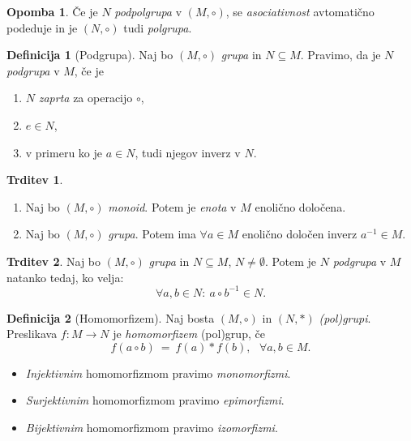\documentclass[11pt]{article}
\newcommand{\0}{\mathbf{0}}
\newcommand{\M}{M}
\newcommand{\NN}{N}
\theoremstyle{definition}
\newtheorem{definicija}{Definicija}[section]
\theoremstyle{definition}
\newtheorem{trditev}{Trditev}[section]
\theoremstyle{definition}
\theoremstyle{definition}
\newtheorem*{opomba}{Opomba}
\begin{document}
\begin{opomba}

Če je $\NN$ \textit{podpolgrupa} v $(\M, \circ)$, se \textit{asociativnost} avtomatično podeduje in je $(\NN, \circ)$ tudi \textit{polgrupa}.

\end{opomba}
\vspace{0.5cm}

\begin{definicija}[Podgrupa]

Naj bo $(\M, \circ)$ \textit{grupa} in $\NN \subseteq \M$. Pravimo, da je $\NN$ \textit{podgrupa} v $\M$, če je
\begin{enumerate}
	\item $\NN$ \textit{zaprta} za operacijo $\circ$,
	\item $e \in \NN$,
	\item v primeru ko je $a \in \NN$, tudi njegov inverz v $\NN$.
\end{enumerate}

\end{definicija}
\vspace{0.5cm}

\begin{trditev}
~
\begin{enumerate}
	\item Naj bo $(\M, \circ)$ \textit{monoid}. Potem je \textit{enota} v $\M$ enolično določena.
	\item Naj bo $(\M, \circ)$ \textit{grupa}. Potem ima $\forall a \in \M$ enolično določen inverz $a^{-1} \in \M$.
\end{enumerate}

\end{trditev}
\vspace{0.5cm}

\begin{trditev}

Naj bo $(\M, \circ)$ \textit{grupa} in $\NN \subseteq \M$, $\NN \neq \emptyset$. Potem je $\NN$ \textit{podgrupa} v $\M$ natanko tedaj, ko velja:
$$\forall a, b \in \NN: ~a \circ b^{-1} \in \NN.$$

\end{trditev}
\vspace{0.5cm}

\begin{definicija}[Homomorfizem]

Naj bosta $(\M, \circ)$ in $(\NN, *)$ \textit{(pol)grupi}. Preslikava $f: \M \rightarrow \NN$ je \textit{homomorfizem} (pol)grup, če
$$f(a \circ b) ~=~ f(a) * f(b), ~~~\forall a, b \in \M.$$
\begin{itemize}
	\item \textit{Injektivnim} homomorfizmom pravimo \textit{monomorfizmi}.
	\item \textit{Surjektivnim} homomorfizmom pravimo \textit{epimorfizmi}.
	\item \textit{Bijektivnim} homomorfizmom pravimo \textit{izomorfizmi}.
\end{itemize}

\end{definicija}
\vspace{0.5cm}
\end{document}
